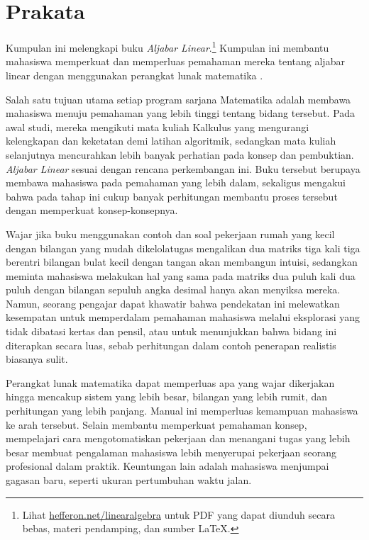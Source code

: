 \chapter*{Prakata}\pagestyle{preface}\thispagestyle{preface}
\setlength{\parskip}{.25ex}


Kumpulan ini melengkapi buku \nocite{Hefferon12}
\textit{Aljabar Linear}.\footnote{Lihat
\protect\url{hefferon.net/linearalgebra}
untuk PDF yang dapat diunduh secara bebas, materi pendamping, dan
sumber \protect\LaTeX{}.}
Kumpulan ini membantu mahasiswa memperkuat dan memperluas pemahaman mereka
tentang aljabar linear dengan menggunakan perangkat lunak matematika
\Sage{}.%

Salah satu tujuan utama setiap program sarjana Matematika adalah membawa
mahasiswa menuju pemahaman yang lebih tinggi tentang bidang tersebut.
Pada awal studi, mereka mengikuti mata kuliah Kalkulus yang mengurangi
kelengkapan dan keketatan demi latihan algoritmik, sedangkan mata kuliah
selanjutnya mencurahkan lebih banyak perhatian pada konsep dan pembuktian.
\textit{Aljabar Linear} sesuai dengan rencana perkembangan ini.
Buku tersebut berupaya membawa mahasiswa pada pemahaman yang lebih dalam,
sekaligus mengakui bahwa pada tahap ini cukup banyak perhitungan membantu
proses tersebut dengan memperkuat konsep-konsepnya.

Wajar jika buku menggunakan contoh dan soal pekerjaan rumah yang kecil dengan
bilangan yang mudah dikelola\Dash tugas mengalikan dua matriks tiga kali tiga
berentri bilangan bulat kecil dengan tangan akan membangun intuisi, sedangkan
meminta mahasiswa melakukan hal yang sama pada matriks dua puluh kali dua
puluh dengan bilangan sepuluh angka desimal hanya akan menyiksa mereka.
Namun, seorang pengajar dapat khawatir bahwa pendekatan ini melewatkan
kesempatan untuk memperdalam pemahaman mahasiswa melalui eksplorasi yang tidak
dibatasi kertas dan pensil, atau untuk menunjukkan bahwa bidang ini diterapkan
secara luas, sebab perhitungan dalam contoh penerapan realistis biasanya
sulit.

Perangkat lunak matematika dapat memperluas apa yang wajar dikerjakan hingga
mencakup sistem yang lebih besar, bilangan yang lebih rumit, dan perhitungan
yang lebih panjang.
Manual ini memperluas kemampuan mahasiswa ke arah tersebut.
Selain membantu memperkuat pemahaman konsep, mempelajari cara mengotomatiskan
pekerjaan dan menangani tugas yang lebih besar membuat pengalaman mahasiswa
lebih menyerupai pekerjaan seorang profesional dalam praktik.
Keuntungan lain adalah mahasiswa menjumpai gagasan baru, seperti ukuran
pertumbuhan waktu jalan.

